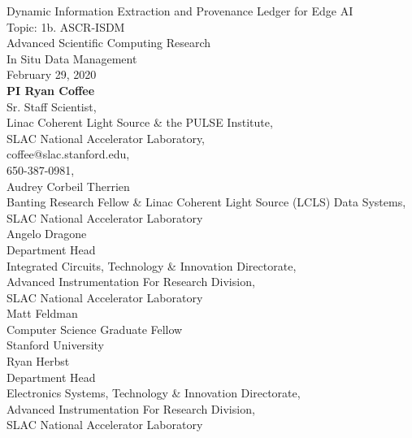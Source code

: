 \documentclass{article}
\begin{document}
\begin{centering}
\large
Dynamic Information Extraction and Provenance Ledger for Edge AI \\
\normalsize
	\vspace{\baselineskip}
	Topic: 1b. ASCR-ISDM\\
	Advanced Scientific Computing Research\\
	In Situ Data Management\\
	\vspace{\baselineskip}
	February 29, 2020\\
	\vspace{2\baselineskip}
	\textbf{PI Ryan Coffee}\\
	Sr. Staff Scientist,\\
	Linac Coherent Light Source \& the PULSE Institute,\\
	SLAC National Accelerator Laboratory, \\coffee@slac.stanford.edu,\\ 650-387-0981, \\
	\vspace{.5\baselineskip}
	Audrey Corbeil Therrien\\Banting Research Fellow \& Linac Coherent Light Source (LCLS) Data Systems,\\
	SLAC National Accelerator Laboratory\\
	\vspace{.5\baselineskip}
	Angelo Dragone\\
	Department Head\\
	Integrated Circuits, Technology \& Innovation Directorate,\\
	Advanced Instrumentation For Research Division,\\
	SLAC National Accelerator Laboratory\\
	\vspace{.5\baselineskip}
	Matt Feldman\\
	Computer Science Graduate Fellow\\
	Stanford University\\
	\vspace{.5\baselineskip}
	Ryan Herbst\\
	Department Head\\
	Electronics Systems, Technology \& Innovation Directorate,\\
	Advanced Instrumentation For Research Division,\\
	SLAC National Accelerator Laboratory\\
	\vspace{.5\baselineskip}

\end{centering}
\end{document}
